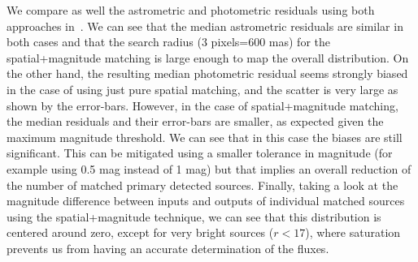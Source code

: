 \documentclass[twocolumn]{aastex62}
\begin{document}
We compare as well the astrometric and photometric residuals using both approaches in~. We can see that the median astrometric residuals are similar in both cases and that the search radius (3 pixels=600 mas) for the spatial+magnitude matching is large enough to map the overall distribution. On the other hand, the resulting median photometric residual seems strongly biased in the case of using just pure spatial matching, and the scatter is very large as shown by the error-bars. However, in the case of spatial+magnitude matching, the median residuals and their error-bars are smaller, as expected given the maximum magnitude threshold. We can see that in this case the biases are still significant. This can be mitigated using a smaller tolerance in magnitude (for example using 0.5 mag instead of 1 mag) but that implies an overall reduction of the number of matched primary detected sources. Finally, taking a look at the magnitude difference between inputs and outputs of individual matched sources using the spatial+magnitude technique, we can see that this distribution is centered around zero, except for very bright sources ($r < 17$), where saturation prevents us from having an accurate determination of the fluxes. 
\end{document}
